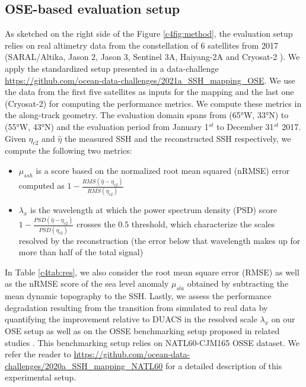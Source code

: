 \begin{bibunit}
\subsection*{OSE-based evaluation setup}
\label{c4ssec:eval}
As sketched on the right side of the Figure \ref{c4fig:method},
the evaluation setup relies on real altimetry data from the constellation of 6 satellites from 2017 (SARAL/Altika, Jason 2, Jason 3, Sentinel 3A, Haiyang-2A and Cryosat-2 ).
We apply the standardized setup presented in a data-challenge \url{https://github.com/ocean-data-challenges/2021a_SSH_mapping_OSE}.
We use the data from the first five satellites as inputs for the mapping and the last one (Cryosat-2) for computing the performance metrics. We compute these metrics in the along-track geometry. %
The evaluation domain spans from (65°W, 33°N) to (55°W, 43°N)  and the evaluation period from January 1$^{st}$ to December 31$^{st}$ 2017.  Given $\eta_{c2}$ and $\hat{\eta}$ the measured SSH and the reconstructed SSH respectively, we compute the following two metrics:

\begin{itemize}
    \item{$\mu_{ssh}$ is a score based on the normalized root mean squared (nRMSE) error  computed as $1 - \displaystyle\frac{RMS(\hat{\eta} - \eta_{c2})}{RMS(\eta_{c2})}$}
    \item{$\lambda_x$ is the wavelength at which the power spectrum density (PSD) score  $1 - \displaystyle \frac{PSD(\hat{\eta} - \eta_{c2})}{PSD(\eta_{c2})}$ crosses the $0.5$ threshold, which characterize the scales resolved by the reconstruction (the error below that wavelength makes up for more than half of the total signal)}
\end{itemize}

In Table \ref{c4tab:res}, we also consider the root mean square error (RMSE) as well as the nRMSE score of the sea level anomaly $\mu_{sla}$ obtained by subtracting the mean dynamic topography to the SSH. Lastly, we assess the performance degradation resulting from the transition from simulated to real data by quantifying the improvement relative to DUACS in the resolved scale $\lambda_x$ on our OSE setup as well as on
the OSSE benchmarking setup proposed in related studies \cite{guillouMappingAltimetryForthcoming2021}. This benchmarking setup relies on NATL60-CJM165 OSSE dataset. We refer the reader to \url{https://github.com/ocean-data-challenges/2020a_SSH_mapping\_NATL60} for a detailed description of this experimental setup.







\end{bibunit}
